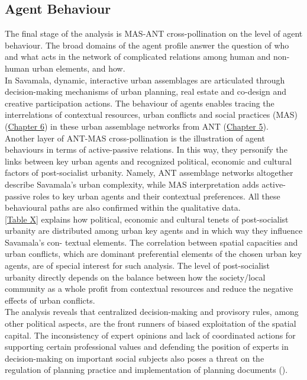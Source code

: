 \documentclass[11pt]{report}
\begin{document}
{{{\subsection{Agent Behaviour}

The final stage of the analysis is MAS-ANT cross-pollination on the level of agent behaviour. The broad domains of the agent profile answer the question of who and what acts in the network of complicated relations among human and non-human urban elements, and how.
\\

In Savamala, dynamic, interactive urban assemblages are articulated through decision-making mechanisms of urban planning, real estate and co-design and creative participation actions.
The behaviour of agents enables tracing the interrelations of contextual resources, urban conflicts and social practices (MAS) (\href{Chapter 6}{Chapter 6}) in these urban assemblage networks from ANT (\href{Chapter 5}{Chapter 5}).
\\

Another layer of ANT-MAS cross-pollination is the illustration of agent behaviours in terms of active-passive relations. In this way, they personify the links between key urban agents and recognized political, economic and cultural factors of post-socialist urbanity. Namely, ANT assemblage networks altogether describe Savamala’s urban complexity, while MAS interpretation adds active-passive roles to key urban agents and their contextual preferences. All these behavioural paths are also confirmed within the qualitative data.
\\

[\href{TableX}{Table X}] explains how political, economic and cultural tenets of post-socialist urbanity are distributed among urban key agents and in which way they influence Savamala’s con- textual elements. The correlation between spatial capacities and urban conflicts, which are dominant preferential elements of the chosen urban key agents, are of special interest for such analysis. The level of post-socialist urbanity directly depends on the balance between how the society/local community as a whole profit from contextual resources and reduce the negative effects of urban conflicts.
\\

The analysis reveals that centralized decision-making and provisory rules, among other political aspects, are the front runners of biased exploitation of the spatial capital. The inconsistency of expert opinions and lack of coordinated actions for supporting certain professional values and defending the position of experts in decision-making on important social subjects also poses a threat on the regulation of planning practice and implementation of planning documents (\href{Vukmirovic}{\citealt{vukmirovic_city_2013}}).
\\

}}}
\end{document}
